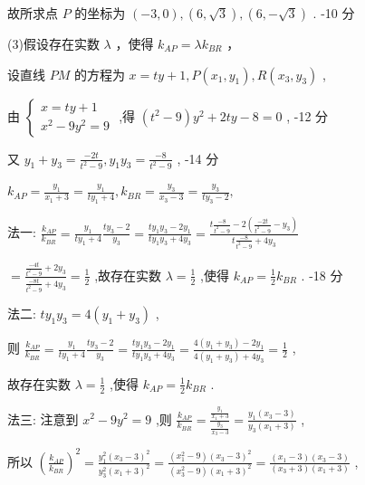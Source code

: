 \documentclass[10pt]{article}
\begin{document}
故所求点 \(P\) 的坐标为 \(\left( {-3,0}\right) ,\left( {6,\sqrt{3}}\right) ,\left( {6, - \sqrt{3}}\right)\) . -10 分

(3)假设存在实数 \(\lambda\) ，使得 \({k}_{AP} = \lambda {k}_{BR}\) ，

设直线 \({PM}\) 的方程为 \(x = {ty} + 1,P\left( {{x}_{1},{y}_{1}}\right) ,R\left( {{x}_{3},{y}_{3}}\right)\) ,

由 \(\left\{  \begin{array}{l} x = {ty} + 1 \\  {x}^{2} - 9{y}^{2} = 9 \end{array}\right.\) ,得 \(\left( {{t}^{2} - 9}\right) {y}^{2} + {2ty} - 8 = 0\) , -12 分

又 \({y}_{1} + {y}_{3} = \frac{-{2t}}{{t}^{2} - 9},{y}_{1}{y}_{3} = \frac{-8}{{t}^{2} - 9}\) , -14 分

\({k}_{AP} = \frac{{y}_{1}}{{x}_{1} + 3} = \frac{{y}_{1}}{t{y}_{1} + 4},{k}_{BR} = \frac{{y}_{3}}{{x}_{3} - 3} = \frac{{y}_{3}}{t{y}_{3} - 2},\)

法一: \(\frac{{k}_{AP}}{{k}_{BR}} = \frac{{y}_{1}}{t{y}_{1} + 4}\frac{t{y}_{3} - 2}{{y}_{3}} = \frac{t{y}_{1}{y}_{3} - 2{y}_{1}}{t{y}_{1}{y}_{3} + 4{y}_{3}} = \frac{t\frac{-8}{{t}^{2} - 9} - 2\left( {\frac{-{2t}}{{t}^{2} - 9} - {y}_{3}}\right) }{t\frac{-8}{{t}^{2} - 9} + 4{y}_{3}}\)

\(= \frac{\frac{-{4t}}{{t}^{2} - 9} + 2{y}_{3}}{\frac{-{8t}}{{t}^{2} - 9} + 4{y}_{3}} = \frac{1}{2}\) ,故存在实数 \(\lambda  = \frac{1}{2}\) ,使得 \({k}_{AP} = \frac{1}{2}{k}_{BR}\) . -18 分

法二: \(t{y}_{1}{y}_{3} = 4\left( {{y}_{1} + {y}_{3}}\right)\) ,

则 \(\frac{{k}_{AP}}{{k}_{BR}} = \frac{{y}_{1}}{t{y}_{1} + 4}\frac{t{y}_{3} - 2}{{y}_{3}} = \frac{t{y}_{1}{y}_{3} - 2{y}_{1}}{t{y}_{1}{y}_{3} + 4{y}_{3}} = \frac{4\left( {{y}_{1} + {y}_{3}}\right)  - 2{y}_{1}}{4\left( {{y}_{1} + {y}_{3}}\right)  + 4{y}_{3}} = \frac{1}{2}\) ,

故存在实数 \(\lambda  = \frac{1}{2}\) ,使得 \({k}_{AP} = \frac{1}{2}{k}_{BR}\) .

法三: 注意到 \({x}^{2} - 9{y}^{2} = 9\) ,则 \(\frac{{k}_{AP}}{{k}_{BR}} = \frac{\frac{{y}_{1}}{{x}_{1} + 3}}{\frac{{y}_{3}}{{x}_{3} - 3}} = \frac{{y}_{1}\left( {{x}_{3} - 3}\right) }{{y}_{3}\left( {{x}_{1} + 3}\right) }\) ,

所以 \({\left( \frac{{k}_{AP}}{{k}_{BR}}\right) }^{2} = \frac{{y}_{1}^{2}{\left( {x}_{3} - 3\right) }^{2}}{{y}_{3}^{2}{\left( {x}_{1} + 3\right) }^{2}} = \frac{\left( {{x}_{1}^{2} - 9}\right) {\left( {x}_{3} - 3\right) }^{2}}{\left( {{x}_{3}^{2} - 9}\right) {\left( {x}_{1} + 3\right) }^{2}} = \frac{\left( {{x}_{1} - 3}\right) \left( {{x}_{3} - 3}\right) }{\left( {{x}_{3} + 3}\right) \left( {{x}_{1} + 3}\right) }\) ,
\end{document}
